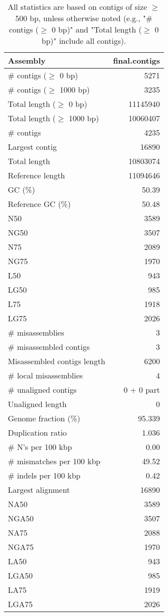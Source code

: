 \documentclass[12pt,a4paper]{article}
\begin{document}
\begin{table}[ht]
\begin{center}
\caption{All statistics are based on contigs of size $\geq$ 500 bp, unless otherwise noted (e.g., "\# contigs ($\geq$ 0 bp)" and "Total length ($\geq$ 0 bp)" include all contigs).}
\begin{tabular}{|l*{1}{|r}|}
\hline
Assembly & final.contigs \\ \hline
\# contigs ($\geq$ 0 bp) & 5271 \\ \hline
\# contigs ($\geq$ 1000 bp) & 3235 \\ \hline
Total length ($\geq$ 0 bp) & 11145940 \\ \hline
Total length ($\geq$ 1000 bp) & 10060407 \\ \hline
\# contigs & 4235 \\ \hline
Largest contig & 16890 \\ \hline
Total length & 10803074 \\ \hline
Reference length & 11094646 \\ \hline
GC (\%) & 50.39 \\ \hline
Reference GC (\%) & 50.48 \\ \hline
N50 & 3589 \\ \hline
NG50 & 3507 \\ \hline
N75 & 2089 \\ \hline
NG75 & 1970 \\ \hline
L50 & 943 \\ \hline
LG50 & 985 \\ \hline
L75 & 1918 \\ \hline
LG75 & 2026 \\ \hline
\# misassemblies & 3 \\ \hline
\# misassembled contigs & 3 \\ \hline
Misassembled contigs length & 6200 \\ \hline
\# local misassemblies & 4 \\ \hline
\# unaligned contigs & 0 + 0 part \\ \hline
Unaligned length & 0 \\ \hline
Genome fraction (\%) & 95.339 \\ \hline
Duplication ratio & 1.036 \\ \hline
\# N's per 100 kbp & 0.00 \\ \hline
\# mismatches per 100 kbp & 49.52 \\ \hline
\# indels per 100 kbp & 0.42 \\ \hline
Largest alignment & 16890 \\ \hline
NA50 & 3589 \\ \hline
NGA50 & 3507 \\ \hline
NA75 & 2088 \\ \hline
NGA75 & 1970 \\ \hline
LA50 & 943 \\ \hline
LGA50 & 985 \\ \hline
LA75 & 1919 \\ \hline
LGA75 & 2026 \\ \hline
\end{tabular}
\end{center}
\end{table}
\end{document}
